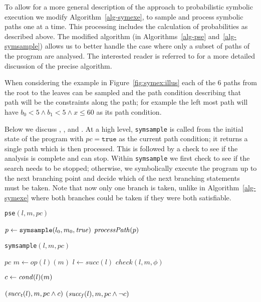 To allow for a more general description of the approach to probabilistic symbolic execution we modify Algorithm~\ref{alg-symexe}, to sample and process symbolic paths one at a time. This processing includes the calculation of probabilities as described above.  The modified algorithm (in Algorithms~\ref{alg-pse} and~\ref{alg-symsample}) allows us to better handle the case where only a subset of paths of the program are analysed. The interested reader is referred to \cite{filieri2014statistical} for a more detailed discussion of the precise algorithm.

When considering the example in Figure~\ref{fig:symex:illus} each of the $6$ paths from the root to the leaves can be sampled and the path condition describing that path will be the constraints along the path; for example the left most path will have $b_0 < 5 \wedge b_1 < 5 \wedge x \le 60$ as its path condition. 

Below we discuss , ,  and . At a high level, {\tt symsample} is called from the initial state of the program with $pc=\mathtt{true}$ as the current path condition;  it returns a single path which is then processed.  This is followed by a check to see if the analysis is complete and can stop. Within {\tt symsample} we first check to see if the search needs to be stopped; otherwise, we symbolically execute the program up to the next branching point and decide which of the next branching statements must be taken. Note that now only one branch is taken, unlike in Algorithm~\ref{alg-symexe} where both branches could be taken if they were both satisfiable. 

\begin{minipage}{0.4\textwidth}
\begin{algorithm}[H]
\caption{{\tt pse}$(l,m,pc)$}
\label{alg-pse}
\begin{algorithmic}
 \REPEAT
  \STATE $p \gets {\tt symsample}(l_0, m_0, \mathit{true})$
  \STATE $\mathit{processPath}(p)$
\end{algorithmic}
\end{algorithm}
\end{minipage}
\begin{minipage}{0.5\textwidth}
\begin{algorithm}[H]
\caption{{\tt symsample}$(l,m,pc)$}
\label{alg-symsample}
\begin{algorithmic}
 \RETURN $pc$
 \ENDIF
   \STATE $m \gets op(l)(m)$
   \STATE $l \gets succ(l)$
   \STATE $check(l,m,\phi)$
 \ENDWHILE
 
 
 \STATE $c \gets \mathit{cond}(l)(m)$
 
   $(\mathit{succ_t}(l), m, pc \wedge c)$
 \ELSE
   $(\mathit{succ_f}(l), m, pc \wedge \neg c)$
 \ENDIF
\end{algorithmic}
\end{algorithm}
\end{minipage}

